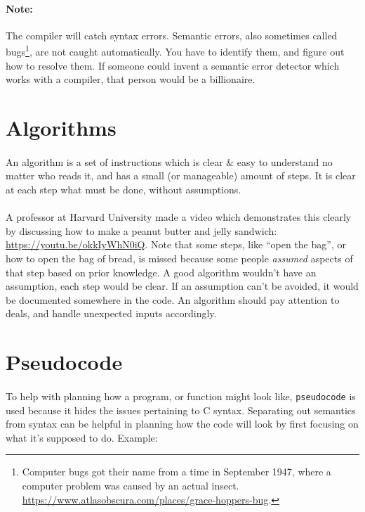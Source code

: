 \documentclass[letter,11pt]{article}
\begin{document}
\paragraph{Note:}The compiler will catch syntax errors. Semantic errors, also sometimes called bugs\footnote{Computer bugs got their name from a time in September 1947, where a computer problem was caused by an actual insect. \url{https://www.atlasobscura.com/places/grace-hoppers-bug}.}, are not caught automatically. You have to identify them, and figure out how to resolve them. If someone could invent a semantic error detector which works with a compiler, that person would be a billionaire.

\section{Algorithms}
\paragraph{}An algorithm is a set of instructions which is clear \& easy to understand no matter who reads it, and has a small (or manageable) amount of steps. It is clear at each step what must be done, without assumptions.

\paragraph{}A professor at Harvard University made a video which demonstrates this clearly by discussing how to make a peanut butter and jelly sandwich: \url{https://youtu.be/okkIyWhN0iQ}. Note that some steps, like ``open the bag'', or how to open the bag of bread, is missed because some people \textit{assumed} aspects of that step based on prior knowledge. A good algorithm wouldn't have an assumption, each step would be clear. If an assumption can't be avoided, it would be documented somewhere in the code. An algorithm should pay attention to deals, and handle unexpected inputs accordingly.

\section{Pseudocode}
\paragraph{}To help with planning how a program, or function might look like, \texttt{pseudocode} is used because it hides the issues pertaining to C syntax. Separating out semantics from syntax can be helpful in planning how the code will look by first focusing on what it's supposed to do. Example:
\end{document}

